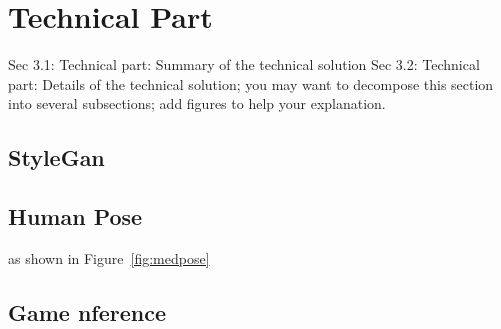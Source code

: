 \section{Technical Part}
Sec 3.1: Technical part: Summary of the technical solution
Sec 3.2: Technical part: Details of the technical solution; you may want to decompose this section into several subsections; add figures to help your explanation.
\subsection{StyleGan}

\subsection{Human Pose}
as shown in Figure~\ref{fig:medpose}

\subsection{Game nference}